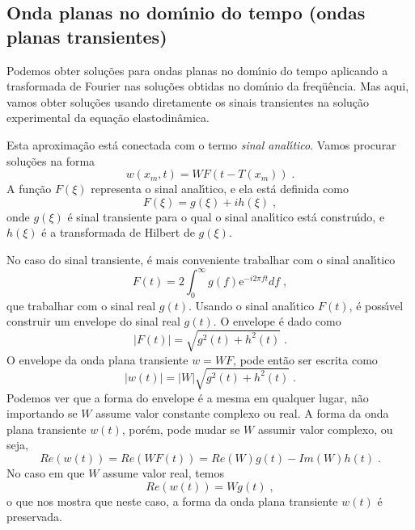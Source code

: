 \subsection{Onda planas no dom\'{\i}nio do tempo (ondas planas
transientes)}

Podemos obter solu\c{c}\~oes para ondas planas no dom\'{\i}nio do
tempo aplicando a trasformada de Fourier nas solu\c{c}\~oes
obtidas no dom\'{\i}nio da freq\"u\^encia. Mas aqui, vamos obter
solu\c{c}\~oes usando diretamente os sinais transientes na
solu\c{c}\~ao experimental da equa\c{c}\~ao elastodin\^amica.

Esta aproxima\c{c}\~ao est\'a conectada com o termo {\it sinal
anal\'{\i}tico}. Vamos procurar solu\c{c}\~oes na forma
\begin{equation}
w(x_m,t)=W F(t-T(x_m)) \;.
\end{equation}
A fun\c{c}\~ao $F(\xi)$ representa o sinal anal\'{\i}tico, e ela
est\'a definida como
\begin{equation}
F(\xi)=g(\xi)+ih(\xi) \;,
\end{equation}
onde $g(\xi)$ \'e sinal transiente para o qual o sinal
anal\'{\i}tico est\'a constru\'{\i}do, e $h(\xi)$ \'e a
transformada de Hilbert de $g(\xi)$.

No caso do sinal transiente, \'e mais conveniente trabalhar com o
sinal anal\'{\i}tico
\begin{equation}
F(t)=2 \int_0^{\infty} g(f) \mathrm{e}^{-i2\pi f t} df \;,
\end{equation}
que trabalhar com o sinal real $g(t)$. Usando o sinal
anal\'{\i}tico $F(t)$, \'e poss\'{\i}vel construir um envelope do
sinal real $g(t)$. O envelope \'e dado como
\begin{equation}
|F(t)|=\sqrt{g^2(t)+h^2(t)} \;.
\end{equation}
O envelope da onda plana transiente $w = WF$, pode ent\~ao ser
escrita como
\begin{equation}
|w(t)|=|W|\sqrt{g^2(t)+h^2(t)} \;.
\end{equation}
Podemos ver que a forma do envelope \'e a mesma em qualquer lugar,
n\~ao importando se $W$ assume valor constante complexo ou real. A
forma da onda plana transiente $w(t)$, por\'em, pode mudar se $W$
assumir valor complexo, ou seja,
\begin{equation}
Re(w(t))=Re(WF(t))=Re(W)g(t)-Im(W)h(t) \;.
\end{equation}
No caso em que $W$ assume valor real, temos
\begin{equation}
Re(w(t))=Wg(t) \;,
\end{equation}
o que nos mostra que neste caso, a forma da onda plana transiente
$w(t)$ \'e preservada.

